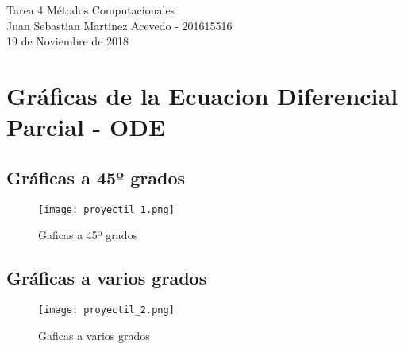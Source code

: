 \documentclass[11pt,letterpaper]{exam}
\begin{document}
\begin{center}
{\Large  Tarea 4 Métodos Computacionales} \\
Juan Sebastian Martinez Acevedo - \textsc{201615516}\\
19 de Noviembre de 2018\\
\end{center}


\noindent

\section{Gráficas de la Ecuacion Diferencial Parcial - ODE}
\subsection{Gráficas a 45º grados}
\begin{figure}[H]
\centering
\texttt{[image: proyectil\_1.png]}
\caption{Gaficas a 45º grados}\label{Fi:Imag3}
\end{figure}

\subsection{Gráficas a varios grados}
\begin{figure}[H]
\centering
\texttt{[image: proyectil\_2.png]}
\caption{Gaficas a varios grados}\label{Fi:Imag3}
\end{figure}
\end{document}

